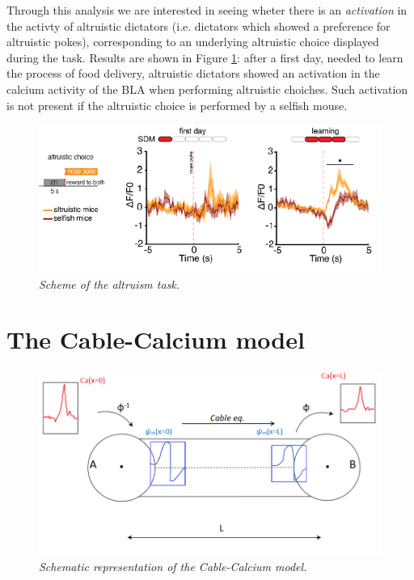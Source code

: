 \documentclass[11pt,a4paper,twocolumn]{article}
\begin{document}
Through this analysis we are interested in seeing wheter there is an \textit{activation} in the activty of  altruistic dictators (i.e. dictators which showed a preference for altruistic pokes), corresponding to an underlying altruistic choice displayed during the task.
Results are shown in Figure \ref{altr_short}: after a first day, needed to learn the process of food delivery, altruistic dictators showed an activation in the calcium activity of the BLA when performing altruistic choiches. Such activation is not present if the altruistic choice is performed by a selfish mouse.
\begin{figure}[H]
	\begin{center}
		\includegraphics[scale=0.45]{altr_short.png} 
	\end{center} 
	\caption{\textit{Scheme of the altruism task.}} \label{altr_short}
	
\end{figure}

\section{The Cable-Calcium model}

\begin{figure}[H]
	\begin{center}
		
		\includegraphics[scale=0.35]{cable_ca.png} 
	\end{center} 
	\caption{\textit{Schematic representation of the Cable-Calcium model.}}
	\label{cabel_ca}
\end{figure}
\end{document}
